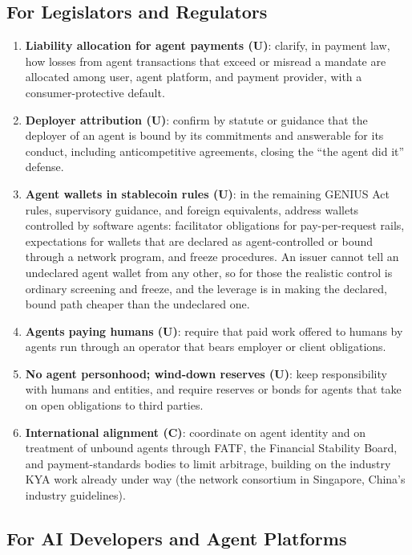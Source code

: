 \documentclass[11pt,letterpaper]{article}
\begin{document}
\subsection{For Legislators and Regulators}

\begin{policybox}
\begin{enumerate}
  \item \textbf{Liability allocation for agent payments (U)}: clarify, in payment law, how losses from agent transactions that exceed or misread a mandate are allocated among user, agent platform, and payment provider, with a consumer-protective default.
  \item \textbf{Deployer attribution (U)}: confirm by statute or guidance that the deployer of an agent is bound by its commitments and answerable for its conduct, including anticompetitive agreements, closing the ``the agent did it'' defense.
  \item \textbf{Agent wallets in stablecoin rules (U)}: in the remaining GENIUS Act rules, supervisory guidance, and foreign equivalents, address wallets controlled by software agents: facilitator obligations for pay-per-request rails, expectations for wallets that are declared as agent-controlled or bound through a network program, and freeze procedures. An issuer cannot tell an undeclared agent wallet from any other, so for those the realistic control is ordinary screening and freeze, and the leverage is in making the declared, bound path cheaper than the undeclared one.
  \item \textbf{Agents paying humans (U)}: require that paid work offered to humans by agents run through an operator that bears employer or client obligations.
  \item \textbf{No agent personhood; wind-down reserves (U)}: keep responsibility with humans and entities, and require reserves or bonds for agents that take on open obligations to third parties.
  \item \textbf{International alignment (C)}: coordinate on agent identity and on treatment of unbound agents through FATF, the Financial Stability Board, and payment-standards bodies to limit arbitrage, building on the industry KYA work already under way (the network consortium in Singapore, China's industry guidelines).
\end{enumerate}
\end{policybox}

\subsection{For AI Developers and Agent Platforms}
\end{document}
